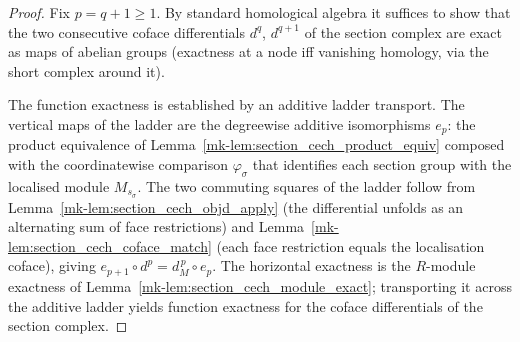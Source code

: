 \begin{proof}
  Fix \(p = q + 1 \geq 1\). By standard homological algebra it suffices to show that
  the two consecutive coface differentials \(d^q\), \(d^{q+1}\) of the section
  complex are exact as maps of abelian groups (exactness at a node iff vanishing
  homology, via the short complex around it).

  The function exactness is established by an additive ladder transport. The
  vertical maps of the ladder are the degreewise additive isomorphisms
  \(e_p\): the product equivalence of Lemma~\ref{mk-lem:section_cech_product_equiv}
  composed with the coordinatewise comparison \(\varphi_\sigma\) that identifies
  each section group with the localised module \(M_{s_\sigma}\). The two
  commuting squares of the ladder follow from
  Lemma~\ref{mk-lem:section_cech_objd_apply} (the differential unfolds as an
  alternating sum of face restrictions) and Lemma~\ref{mk-lem:section_cech_coface_match}
  (each face restriction equals the localisation coface), giving
  \(e_{p+1} \circ d^p = d_M^{\,p} \circ e_p\). The horizontal exactness is
  the \(R\)-module exactness of Lemma~\ref{mk-lem:section_cech_module_exact};
  transporting it across the additive ladder yields function exactness for the
  coface differentials of the section complex.
\end{proof}

